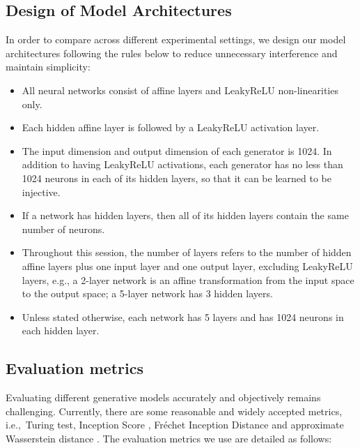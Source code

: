 \documentclass[conference]{IEEEtran}
\newcommand{\ie}{{i.e.,~}}
\begin{document}
\subsection{Design of Model Architectures}
In order to compare across different experimental settings, we 
design our model architectures following the rules below to reduce unnecessary interference and maintain simplicity:
\begin{itemize}
	\item All neural networks consist of affine layers and LeakyReLU non-linearities only.
	\item Each hidden affine layer is followed by a LeakyReLU activation layer.
	\item The input dimension and output dimension of each generator is 1024. In addition to having LeakyReLU activations, each generator has no less than 1024 neurons in each of its hidden layers, so that it can be learned to be injective.
	\item If a network has hidden layers, then all of its hidden layers contain the same number of neurons.
	\item Throughout this session, the number of layers refers to the number of hidden affine layers plus one input layer and one output layer, excluding LeakyReLU layers, e.g., a 2-layer network is an affine transformation from the input space to the output space; a 5-layer network has 3 hidden layers.
	\item Unless stated otherwise, each network has 5 layers and has 1024 neurons in each hidden layer.
\end{itemize}

\subsection{Evaluation metrics}
Evaluating different generative models accurately and objectively remains challenging. Currently, there are some reasonable and widely accepted metrics, \ie Turing test, Inception Score \cite{ImprovedTechniquesforGANS,note_on_IS}, Fréchet Inception Distance \cite{FID} and approximate Wasserstein distance \cite{comparison_of_ml_and_gan}. The evaluation metrics we use are detailed as follows:
\end{document}

